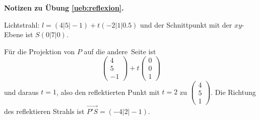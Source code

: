\documentclass[%
11pt,%
twoside,%
titlepage,%
german,%
headsepline%
]{scrartcl}
\theoremstyle{definition}
\theoremstyle{plain}
\newcommand{\concatueb}[1]{ueb:#1}%
\newcommand{\concatlsg}[1]{lsg:#1}%
\newenvironment{lsg}[1]{%
    \par\noindent\textbf{Notizen zu Übung \ref{\concatueb{#1}}.}%
    \label{\concatlsg{#1}}
}{%
    \par%
}
\begin{document}
\begin{lsg}{reflexion}
Lichtstrahl: $l=(4|5|-1)+t(-2|1|0.5)$ und der Schnittpunkt mit der $xy$-Ebene ist $S(0|7|0)$.

Für die Projektion von $P$ auf die \glqq andere\grqq\ Seite ist
$$\begin{pmatrix}
    4\\5\\-1
\end{pmatrix}+t\begin{pmatrix}
    0\\0\\1
\end{pmatrix}$$
und daraus $t=1$, also den reflektierten Punkt mit $t=2$ zu $\begin{pmatrix}
    4\\5\\1
\end{pmatrix}$. Die Richtung des reflektieren Strahls ist $\vec{P'S}=(-4|2|-1)$.
\end{lsg}
\end{document}
